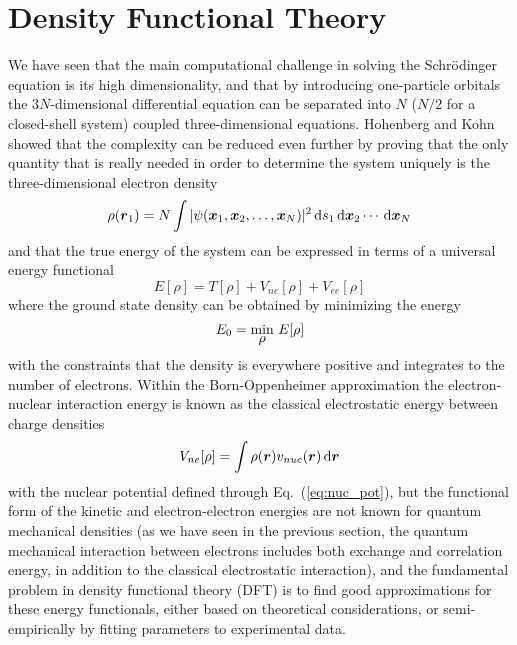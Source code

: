 \section{Density Functional Theory} \label{sec:DFT}
We have seen that the main computational challenge in solving the Schr\"{o}dinger equation is 
its high dimensionality, and that by introducing one-particle orbitals the $3N$-dimensional 
differential equation can be separated into $N$ ($N/2$ for a closed-shell system) coupled 
three-dimensional equations. Hohenberg and Kohn\cite{Hohenberg-Kohn:1964} showed that the 
complexity can be reduced even further by proving that the only quantity that is really
needed in order to determine the system uniquely is the three-dimensional electron density
\begin{equation}
    \rho(\boldsymbol r_1) = N \int |\psi(\boldsymbol x_1,\boldsymbol x_2,\dots,\boldsymbol x_N)|^2 
	\,\mathrm{d} s_1 \,\mathrm{d} \boldsymbol x_2 \cdots \,\mathrm{d} \boldsymbol x_N
\end{equation}
and that the true energy of the system can be expressed in terms of a universal energy functional
\begin{equation}
    E[\rho] = T[\rho] + V_{ne}[\rho] + V_{ee}[\rho]
\end{equation}
where the ground state density can be obtained by minimizing the energy
\begin{equation}
    E_0 = \underset{\hbox{\ensuremath{\rho}}}{\text{min}}\ E[\rho]
\end{equation}
with the constraints that the density is everywhere positive and integrates to the number
of electrons. Within the Born-Oppenheimer approximation the electron-nuclear interaction
energy is known as the classical electrostatic energy between charge densities
\begin{equation}
    V_{ne}[\rho] = \int \rho(\boldsymbol r)v_{nuc}(\boldsymbol r) \,\mathrm{d} \boldsymbol r
\end{equation}
with the nuclear potential defined through Eq.~(\ref{eq:nuc_pot}), but the functional form of 
the kinetic and electron-electron energies are not known for quantum mechanical densities 
(as we have seen in the previous section, the quantum mechanical interaction between electrons 
includes both exchange and correlation energy, in addition to the classical electrostatic 
interaction), and the fundamental problem in density functional theory (DFT) is to find good 
approximations for these energy functionals, either based on theoretical considerations, or 
semi-empirically by fitting parameters to experimental data.

